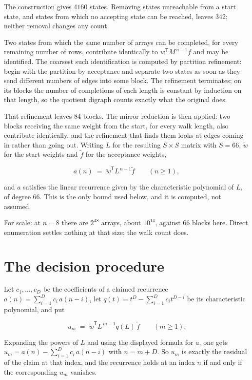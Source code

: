 \documentclass[11pt]{article}
\theoremstyle{definition}
\begin{document}
The construction gives $4160$ states. Removing states unreachable from a start state, and states from which no accepting state can be reached, leaves $342$; neither removal changes any count.

Two states from which the same number of arrays can be completed, for every remaining number of rows, contribute identically to $w^{\mathsf T}M^{\,n-1}f$ and may be identified. The coarsest such identification is computed by partition refinement: begin with the partition by acceptance and separate two states as soon as they send different numbers of edges into some block. The refinement terminates; on its blocks the number of completions of each length is constant by induction on that length, so the quotient digraph counts exactly what the original does.

That refinement leaves $84$ blocks. The mirror reduction is then applied: two blocks receiving the same weight from the start, for every walk length, also contribute identically, and the refinement that finds them looks at edges coming in rather than going out. Writing $L$ for the resulting $S \times S$ matrix with $S = 66$, $\tilde w$ for the start weights and $\tilde f$ for the acceptance weights,

\[a(n) \;=\; \tilde w^{\mathsf T} L^{\,n-1} \tilde f \qquad (n \ge 1),\]

and $a$ satisfies the linear recurrence given by the characteristic polynomial of $L$, of degree $66$. This is the only bound used below, and it is computed, not assumed.

For scale: at $n = 8$ there are $2^{48}$ arrays, about $10^{14}$, against $66$ blocks here. Direct enumeration settles nothing at that size; the walk count does.

\section{The decision procedure}

Let $c_1,\dots,c_D$ be the coefficients of a claimed recurrence $a(n) = \sum_{i=1}^{D} c_i\,a(n-i)$, let $q(t) = t^{D} - \sum_{i=1}^{D} c_i t^{D-i}$ be its characteristic polynomial, and put

\[u_m \;=\; \tilde w^{\mathsf T} L^{\,m-1} q(L)\,\tilde f \qquad (m \ge 1).\]

Expanding the powers of $L$ and using the displayed formula for $a$, one gets $u_m = a(n) - \sum_{i=1}^{D} c_i\,a(n-i)$ with $n = m + D$. So $u_m$ is exactly the residual of the claim at that index, and the recurrence holds at an index $n$ if and only if the corresponding $u_m$ vanishes.
\end{document}
